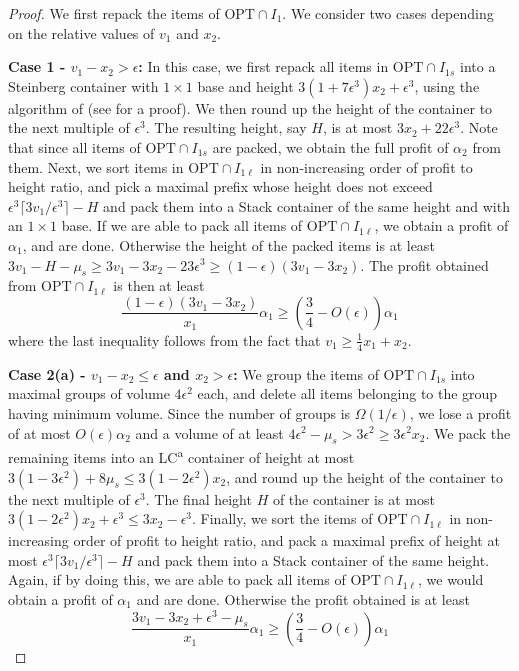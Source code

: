 \iffalse
\begin{proof}
    We first repack the items of $\text{OPT}\cap I_1$. We consider two cases depending on the relative values of $v_1$ and $x_2$.

    \textbf{Case 1 - $v_1-x_2 >\epsilon$:} In this case, we first repack all items in $\text{OPT}\cap I_{1s}$ into a Steinberg container with $1\times 1$ base and height $3(1+7\epsilon^3)x_2 + \epsilon^3$, using the algorithm of  (see  for a proof). We then round up the height of the container to the next multiple of $\epsilon^3$. The resulting height, say $H$, is at most $3x_2+ 22\epsilon^3$. Note that since all items of $\text{OPT}\cap I_{1s}$ are packed, we obtain the full profit of $\alpha_2$ from them. Next, we sort items in $\text{OPT}\cap I_{1\ell}$ in non-increasing order of profit to height ratio, and pick a maximal prefix whose height does not exceed $\epsilon^3\lceil 3v_1/\epsilon^3\rceil -H$ and pack them into a Stack container of the same height and with an $1\times 1$ base. If we are able to pack all items of $\text{OPT}\cap I_{1\ell}$, we obtain a profit of $\alpha_1$, and are done. Otherwise the height of the packed items is at least $3v_1-H-\mu_s\ge 3v_1-3x_2-23\epsilon^3 \ge (1-\epsilon)(3v_1 - 3x_2)$. The profit obtained from $\text{OPT}\cap I_{1\ell}$ is then at least
    \[ \frac{(1-\epsilon)(3v_1-3x_2)}{x_1}\alpha_1 \ge \left(\frac{3}{4}-O(\epsilon)\right)\alpha_1 \]
    where the last inequality follows from the fact that $v_1\ge \frac{1}{4}x_1+x_2$.

    \textbf{Case 2(a) - $v_1-x_2 \le \epsilon$ and $x_2>\epsilon$:} We group the items of $\text{OPT}\cap I_{1s}$ into maximal groups of volume $4\epsilon^2$ each, and delete all items belonging to the group having minimum volume. Since the number of groups is $\Omega(1/\epsilon)$, we lose a profit of at most $O(\epsilon)\alpha_2$ and a volume of at least $4\epsilon^2-\mu_s > 3\epsilon^2 \ge 3\epsilon^2 x_2$. We pack the remaining items into an LC\textsuperscript{a} container of height at most $3(1-3\epsilon^2)+8\mu_s \le 3(1-2\epsilon^2)x_2$, and round up the height of the container to the next multiple of $\epsilon^3$. The final height $H$ of the container is at most $3(1-2\epsilon^2)x_2+\epsilon^3 \le 3x_2 - \epsilon^3$. Finally, we sort the items of $\text{OPT}\cap I_{1\ell}$ in non-increasing order of profit to height ratio, and pack a maximal prefix of height at most $\epsilon^3\lceil 3v_1/\epsilon^3\rceil -H$ and pack them into a Stack container of the same height. Again, if by doing this, we are able to pack all items of $\text{OPT}\cap I_{1\ell}$, we would obtain a profit of $\alpha_1$ and are done. Otherwise the profit obtained is at least 
    \[ \frac{3v_1-3x_2+\epsilon^3-\mu_s}{x_1}\alpha_1 \ge \left(\frac{3}{4}-O(\epsilon)\right)\alpha_1 \]
    

\end{proof}
